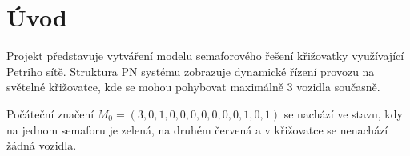 \section*{Úvod}
\label{sec:introduction}

Projekt představuje vytváření modelu semaforového řešení křižovatky využívající Petriho sítě.
Struktura PN systému zobrazuje dynamické řízení provozu na světelné křižovatce, kde se mohou pohybovat maximálně 3 vozidla současně.

Počáteční značení $M_0 = (3, 0, 1, 0, 0, 0, 0, 0, 0, 0, 1, 0, 1)$ se nachází ve stavu, kdy na jednom semaforu je zelená, na druhém červená a v křižovatce se nenachází žádná vozidla.


\endinput